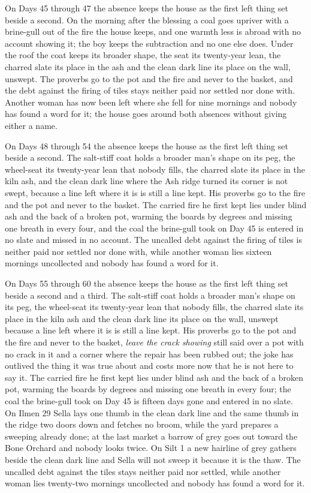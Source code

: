 \documentclass{design/chronicle}
\begin{document}
{On Days 45 through 47 the absence keeps the house as the first left thing set beside a second. On the morning after the blessing a coal goes upriver with a brine-gull out of the fire the house keeps, and one warmth less is abroad with no account showing it; the boy keeps the subtraction and no one else does. Under the roof the coat keeps its broader shape, the seat its twenty-year lean, the charred slate its place in the ash and the clean dark line its place on the wall, unswept. The proverbs go to the pot and the fire and never to the basket, and the debt against the firing of tiles stays neither paid nor settled nor done with. Another woman has now been left where she fell for nine mornings and nobody has found a word for it; the house goes around both absences without giving either a name.

On Days 48 through 54 the absence keeps the house as the first left thing set beside a second. The salt-stiff coat holds a broader man’s shape on its peg, the wheel-seat its twenty-year lean that nobody fills, the charred slate its place in the kiln ash, and the clean dark line where the Ash ridge turned its corner is not swept, because a line left where it is is still a line kept. His proverbs go to the fire and the pot and never to the basket. The carried fire he first kept lies under blind ash and the back of a broken pot, warming the boards by degrees and missing one breath in every four, and the coal the brine-gull took on Day 45 is entered in no slate and missed in no account. The uncalled debt against the firing of tiles is neither paid nor settled nor done with, while another woman lies sixteen mornings uncollected and nobody has found a word for it.

On Days 55 through 60 the absence keeps the house as the first left thing set beside a second and a third. The salt-stiff coat holds a broader man’s shape on its peg, the wheel-seat its twenty-year lean that nobody fills, the charred slate its place in the kiln ash and the clean dark line its place on the wall, unswept because a line left where it is is still a line kept. His proverbs go to the pot and the fire and never to the basket, \emph{leave the crack showing} still said over a pot with no crack in it and a corner where the repair has been rubbed out; the joke has outlived the thing it was true about and costs more now that he is not here to say it. The carried fire he first kept lies under blind ash and the back of a broken pot, warming the boards by degrees and missing one breath in every four; the coal the brine-gull took on Day 45 is fifteen days gone and entered in no slate. On Ilmen 29 Sella lays one thumb in the clean dark line and the same thumb in the ridge two doors down and fetches no broom, while the yard prepares a sweeping already done; at the last market a barrow of grey goes out toward the Bone Orchard and nobody looks twice. On Silt 1 a new hairline of grey gathers beside the clean dark line and Sella will not sweep it because it is the thaw. The uncalled debt against the tiles stays neither paid nor settled, while another woman lies twenty-two mornings uncollected and nobody has found a word for it.

}
\end{document}
